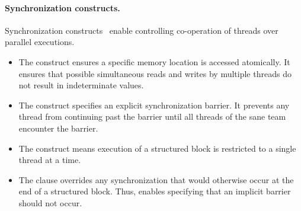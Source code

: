 \paragraph*{Synchronization constructs.}
Synchronization constructs~\cite[p. 473--482]{openmp_api} enable controlling co-operation of threads over parallel executions.

\begin{itemize}

\item The  construct ensures a specific memory location is accessed atomically.
It ensures that possible simultaneous reads and writes by multiple threads do not result in indeterminate values.

\item The  construct specifies an explicit synchronization barrier.
It prevents any thread from continuing past the barrier until all threads of the sane team encounter the barrier.

\item The  construct means execution of a structured block is restricted to a single thread at a time.

\item The  clause overrides any synchronization that would otherwise occur at the end of a structured block.
Thus,  enables specifying that an implicit barrier should not occur.

\end{itemize}


